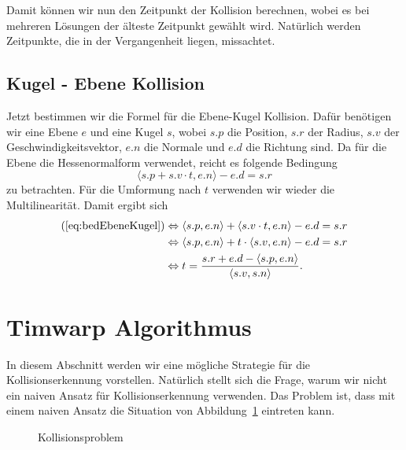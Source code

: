 \documentclass[a4paper, 10pt, openright, parskip, chapterprefix]{scrreprt}
\begin{document}
\noindent Damit können wir nun den Zeitpunkt der Kollision berechnen, wobei es bei mehreren Lösungen der älteste Zeitpunkt gewählt wird. Natürlich werden Zeitpunkte, die in der Vergangenheit liegen, missachtet. 

\subsection{Kugel - Ebene Kollision}
Jetzt bestimmen wir die Formel für die Ebene-Kugel Kollision. Dafür benötigen wir eine Ebene $e$ und eine Kugel $s$, wobei $s.p$ die Position, $s.r$ der Radius, $s.v$ der Geschwindigkeitsvektor, $e.n$ die Normale und $e.d$ die Richtung sind.  Da für die Ebene die Hessenormalform verwendet, reicht es folgende Bedingung 
\begin{equation}
	\langle s.p + s.v  \cdot t, e.n \rangle - e.d = s.r
	\label{eq:bedEbeneKugel}
\end{equation}
zu betrachten. Für die Umformung nach $t$ verwenden wir wieder die Multilinearität. Damit ergibt sich
\begin{align*}
(\ref{eq:bedEbeneKugel}) &\Leftrightarrow \langle s.p, e.n \rangle + \langle s.v \cdot t, e.n \rangle - e.d = s.r \\
&\Leftrightarrow \langle s.p, e.n \rangle + t \cdot \langle s.v, e.n\rangle - e.d = s.r\\
&\Leftrightarrow t = \frac{s.r + e.d - \langle s.p, e.n \rangle}{ \langle s.v, s.n \rangle}\text{.}
\end{align*}
\section{Timwarp Algorithmus}
\label{sec:TimewarpAlgoritmus}

In diesem Abschnitt werden wir eine mögliche Strategie für die Kollisionserkennung vorstellen. Natürlich  stellt sich die Frage, warum wir nicht ein naiven Ansatz für Kollisionserkennung verwenden. Das Problem ist, dass mit einem naiven Ansatz die Situation von Abbildung~\ref{abb:kollision} eintreten kann.

\begin{figure}[h!]
\centering{}
\caption{Kollisionsproblem}
\label{abb:kollision}
\end{figure}
\end{document}
